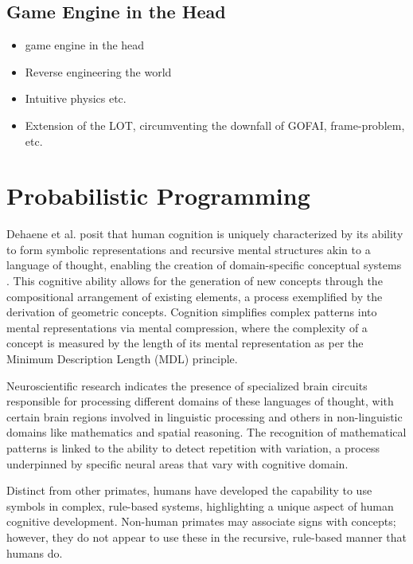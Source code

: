 \subsection{Game Engine in the Head}

\begin{itemize}
    \item game engine in the head
    \item Reverse engineering the world
    \item Intuitive physics etc. 
    \item Extension of the LOT, circumventing the downfall of GOFAI, frame-problem, etc. 
\end{itemize}


\section{Probabilistic Programming}

Dehaene et al. posit that human cognition is uniquely characterized by its ability to form symbolic representations and recursive mental structures akin to a language of thought, enabling the creation of domain-specific conceptual systems \cite{dehaene_symbols_2022}. This cognitive ability allows for the generation of new concepts through the compositional arrangement of existing elements, a process exemplified by the derivation of geometric concepts. Cognition simplifies complex patterns into mental representations via mental compression, where the complexity of a concept is measured by the length of its mental representation as per the Minimum Description Length (MDL) principle.

Neuroscientific research indicates the presence of specialized brain circuits responsible for processing different domains of these languages of thought, with certain brain regions involved in linguistic processing and others in non-linguistic domains like mathematics and spatial reasoning. The recognition of mathematical patterns is linked to the ability to detect repetition with variation, a process underpinned by specific neural areas that vary with cognitive domain.

Distinct from other primates, humans have developed the capability to use symbols in complex, rule-based systems, highlighting a unique aspect of human cognitive development. Non-human primates may associate signs with concepts; however, they do not appear to use these in the recursive, rule-based manner that humans do.

